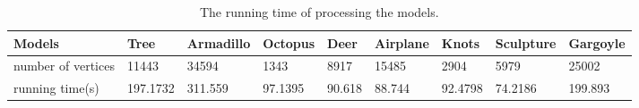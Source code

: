 \begin{table}[htb]

\begin{footnotesize}

\begin{center}

    \begin{tabular}{p{2.3cm} p{1.45cm} p{1.45cm} p{1.5cm} p{1.5cm} p{1.5cm} p{1.5cm} p{1.5cm}p{1.5cm}}

    \hline

     Models& Tree& Armadillo& Octopus& Deer& Airplane& Knots &Sculpture & Gargoyle\\ \hline
     number of vertices & 11443   & 34594   & 1343    & 8917  & 15485 & 2904    & 5979    &25002 \\ \hline
     running time(s)    &197.1732 & 311.559 & 97.1395 &90.618 &88.744 & 92.4798 &74.2186  &199.893 \\ \hline

  \hline

    \end{tabular}

\end{center}

\end{footnotesize}

\caption{The running time of processing the models.}\label{tab:ertms:time}

\end{table}




